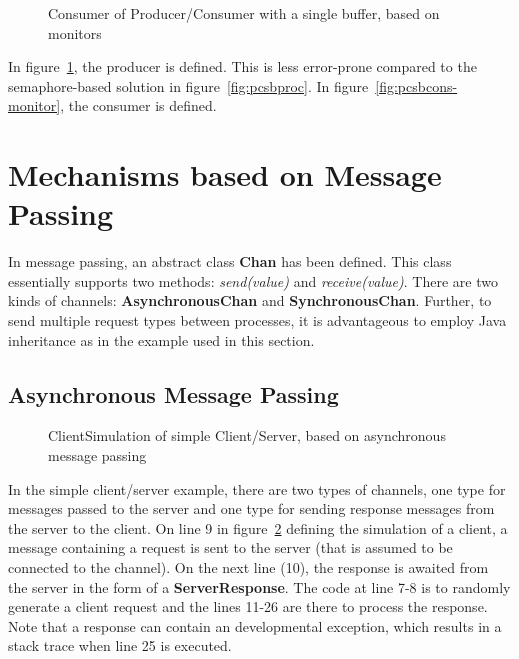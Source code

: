 \documentclass[11pt]{article} %
\begin{document}
\begin{figure}[ht]

\caption{Consumer of Producer/Consumer with a single buffer, based on monitors}
\label{fig:pcsbproc-monitor}
\end{figure}

In figure~\ref{fig:pcsbproc-monitor}, the producer is defined. This is less error-prone compared to the semaphore-based solution in figure~\ref{fig:pcsbproc}. In figure~\ref{fig:pcsbcons-monitor}, the consumer is defined. 

\section{Mechanisms based on Message Passing}

In message passing, an abstract class {\bfseries Chan} has been defined. This class essentially supports two methods: \emph{send(value)} and \emph{receive(value)}. There are two kinds of channels: {\bfseries AsynchronousChan} and {\bfseries SynchronousChan}. Further, to send multiple request types between processes, it is advantageous to employ Java inheritance as in the example used in this section. 

\subsection{Asynchronous Message Passing}

\lstset{inputpath=c:/git/IT325G/IT325G/examples/se/his/iit/it325g/examples/messagePassing/simpleClientServer}
\begin{figure}[ht]

\caption{ClientSimulation of simple Client/Server, based on asynchronous message passing}
\label{fig:scs-clientSimulation}
\end{figure}

In the simple client/server example, there are two types of channels, one type for messages passed to the server and one type for sending response messages from the server to the client. On line 9 in figure~\ref{fig:scs-clientSimulation} defining the simulation of a client, a message containing a request is sent to the server (that is assumed to be connected to the channel). On the next line (10), the response is awaited from the server in the form of a {\bfseries ServerResponse}. The code at line 7-8 is to randomly generate a client request and the lines 11-26 are there to process the response. Note that a response can contain an developmental exception, which results in a stack trace when line 25 is executed. 
\end{document}
